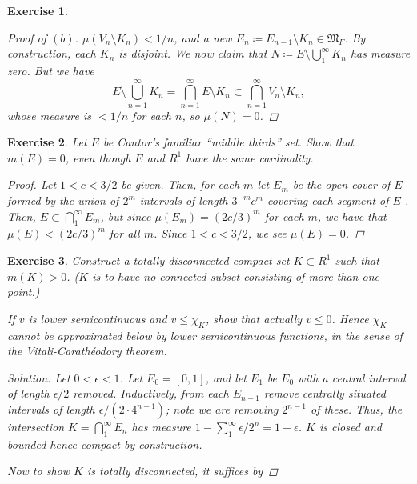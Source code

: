 \documentclass[10pt,letterpaper]{amsart}
\newtheorem{exercise}{Exercise}[section]
\theoremstyle{definition}
\theoremstyle{remark}
\numberwithin{equation}{exercise}
\begin{document}
\begin{multicols}{2}
\begin{exercise}
\begin{proof}[Proof of $(b)$]
      $\mu(V_n \setminus K_n) < 1/n$, and a new $E_n \coloneqq E_{n-1} \setminus
      K_n \in \mathfrak{M}_F$. By construction, each $K_n$ is disjoint. We now
      claim that $N \coloneqq E \setminus \bigcup_1^\infty K_n$ has measure zero.
      But we have
      \begin{equation*}
        E \setminus \bigcup_{n=1}^\infty K_n = \bigcap_{n=1}^\infty E \setminus
        K_n \subset \bigcap_{n=1}^\infty V_n \setminus K_n,
      \end{equation*}
      whose measure is $< 1/n$ for each $n$, so $\mu(N) = 0$.
    \end{proof}
  \end{exercise}
  \begin{exercise}
    Let $E$ be Cantor's familiar ``middle thirds'' set. Show that $m(E) = 0$,
    even though $E$ and $R^1$ have the same cardinality.
    \begin{proof}
      Let $1 < c < 3/2$ be given. Then, for each $m$ let $E_m$ be the open
      cover of $E$ formed by the union of $2^m$ intervals of length
      $3^{-m}c^{m}$ covering each segment of $E$ \cite[2.44]{Rud76}.
      Then, $E \subset \bigcap_1^\infty
      E_m$, but since $\mu(E_m) = (2c/3)^m$ for each $m$, we have that $\mu(E) <
      (2c/3)^m$ for all $m$. Since $1 < c < 3/2$, we see $\mu(E) = 0$.
    \end{proof}
  \end{exercise}
  \begin{exercise}\label{2.6}
    Construct a totally disconnected compact set $K \subset R^1$ such that $m(K)
    > 0$. ($K$ is to have no connected subset consisting of more than one
    point.)
    \par If $v$ is lower semicontinuous and $v \le \chi_K$, show that actually
    $v \le 0$. Hence $\chi_K$ cannot be approximated below by lower
    semicontinuous functions, in the sense of the Vitali-Carath\'eodory theorem.
    \begin{proof}[Solution]
      Let $0 < \epsilon < 1$. Let $E_0 = [0,1]$, and let $E_1$ be $E_0$ with a
      central interval of length $\epsilon/2$ removed. Inductively, from each
      $E_{n-1}$ remove centrally situated intervals of length $\epsilon/(2 \cdot
      4^{n-1})$; note we are removing $2^{n-1}$ of these. Thus, the intersection
      $K = \bigcap_1^\infty E_n$ has measure $1 - \sum_1^\infty \epsilon/2^n = 1
      - \epsilon$. $K$ is closed and bounded hence compact by construction.
      \par Now to show $K$ is totally disconnected, it suffices by

\end{proof}
\end{exercise}
\end{multicols}
\end{document}

